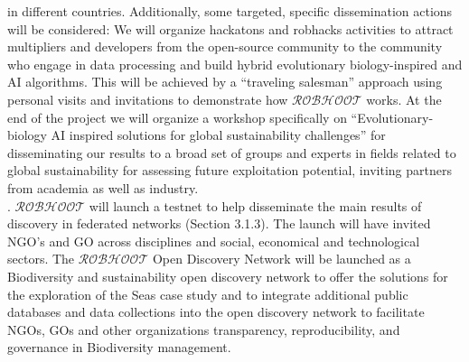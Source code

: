 \documentclass[11pt, a4paper]{article} %
\begin{document}
\begin{itemize}
    in different countries. Additionally, some targeted, specific
    dissemination actions will be considered: We will organize
    hackatons and robhacks activities to attract multipliers and
    developers from the open-source community to the community who
    engage in data processing and build hybrid evolutionary
    biology-inspired and AI algorithms. This will be achieved by a
    “traveling salesman” approach using personal visits and
    invitations to demonstrate how $\mathcal{ROBHOOT}$ works. At the
    end of the project we will organize a workshop specifically on
    ``Evolutionary-biology AI inspired solutions for global
    sustainability challenges'' for disseminating our results to a
    broad set of groups and experts in fields related to global
    sustainability for assessing future exploitation
    potential, inviting partners from academia as well as industry.\\
    \hspace{0.15 in}. $\mathcal{ROBHOOT}$ will launch a testnet to
    help disseminate the main results of discovery in federated
    networks (Section 3.1.3). The launch will have invited NGO’s and
    GO across disciplines and social, economical and technological
    sectors. The $\mathcal{ROBHOOT}$ Open Discovery Network will be
    launched as a Biodiversity and sustainability open discovery
    network to offer the solutions for the exploration of the Seas
    case study and to integrate additional public databases and data
    collections into the open discovery network to facilitate NGOs,
    GOs and other organizations transparency, reproducibility, and
    governance in Biodiversity management.


\end{itemize}
\end{document}
